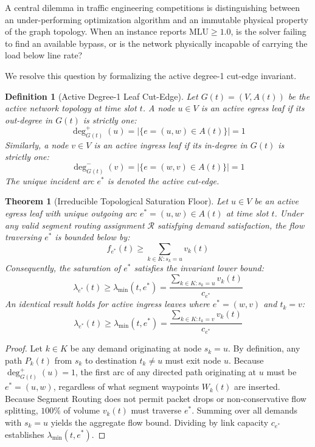 \documentclass[10pt,journal,compsoc]{IEEEtran}
\newtheorem{theorem}{Theorem}
\newtheorem{definition}{Definition}
\begin{document}
A central dilemma in traffic engineering competitions is distinguishing between an under-performing optimization algorithm and an immutable physical property of the graph topology. When an instance reports $\text{MLU} \ge 1.0$, is the solver failing to find an available bypass, or is the network physically incapable of carrying the load below line rate?

We resolve this question by formalizing the active degree-1 cut-edge invariant.

\begin{definition}[Active Degree-1 Leaf Cut-Edge]
Let $G(t) = (V, A(t))$ be the active network topology at time slot $t$. A node $u \in V$ is an active egress leaf if its out-degree in $G(t)$ is strictly one:
\begin{equation}
\operatorname{deg}_{G(t)}^+(u) = |\{ e = (u, w) \in A(t) \}| = 1
\end{equation}
Similarly, a node $v \in V$ is an active ingress leaf if its in-degree in $G(t)$ is strictly one:
\begin{equation}
\operatorname{deg}_{G(t)}^-(v) = |\{ e = (w, v) \in A(t) \}| = 1
\end{equation}
The unique incident arc $e^*$ is denoted the active cut-edge.
\end{definition}

\begin{theorem}[Irreducible Topological Saturation Floor]
\label{thm:floor}
Let $u \in V$ be an active egress leaf with unique outgoing arc $e^* = (u, w) \in A(t)$ at time slot $t$. Under any valid segment routing assignment $\mathcal{R}$ satisfying demand satisfaction, the flow traversing $e^*$ is bounded below by:
\begin{equation}
f_{e^*}(t) \ge \sum_{k \in K : s_k = u} v_k(t)
\end{equation}
Consequently, the saturation of $e^*$ satisfies the invariant lower bound:
\begin{equation}
\lambda_{e^*}(t) \ge \lambda_{\min}(t, e^*) = \frac{\sum_{k \in K : s_k = u} v_k(t)}{c_{e^*}}
\end{equation}
An identical result holds for active ingress leaves where $e^* = (w, v)$ and $t_k = v$:
\begin{equation}
\lambda_{e^*}(t) \ge \lambda_{\min}(t, e^*) = \frac{\sum_{k \in K : t_k = v} v_k(t)}{c_{e^*}}
\end{equation}
\end{theorem}

\begin{proof}
Let $k \in K$ be any demand originating at node $s_k = u$. By definition, any path $P_k(t)$ from $s_k$ to destination $t_k \neq u$ must exit node $u$. Because $\operatorname{deg}_{G(t)}^+(u) = 1$, the first arc of any directed path originating at $u$ must be $e^* = (u, w)$, regardless of what segment waypoints $W_k(t)$ are inserted. Because Segment Routing does not permit packet drops or non-conservative flow splitting, $100\%$ of volume $v_k(t)$ must traverse $e^*$. Summing over all demands with $s_k = u$ yields the aggregate flow bound. Dividing by link capacity $c_{e^*}$ establishes $\lambda_{\min}(t, e^*)$.
\end{proof}
\end{document}
